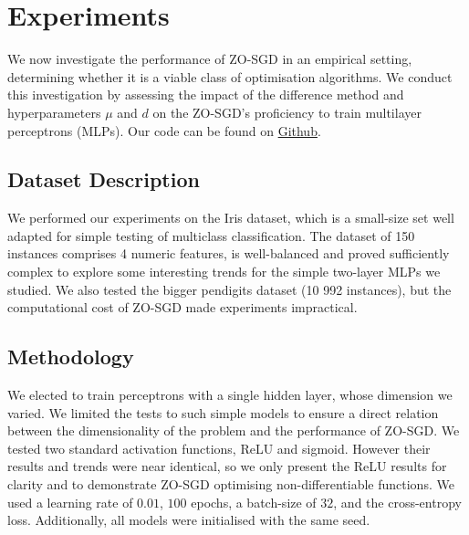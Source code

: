 \section{Experiments}\label{sec:exp}
We now investigate the performance of ZO-SGD in an empirical setting, determining whether it is a viable class of optimisation algorithms. We conduct this investigation by assessing the impact of the difference method and hyperparameters $\mu$ and $d$ on the ZO-SGD's proficiency to train multilayer perceptrons (MLPs). Our code can be found on \href{https://github.com/EdmundHofflin/Optimisation_ML_Project}{Github}.

\subsection{Dataset Description}

We performed our experiments on the Iris dataset, which is a small-size set well adapted for simple testing of multiclass classification. The dataset of 150 instances comprises 4 numeric features, is well-balanced and proved sufficiently complex to explore some interesting trends for the simple two-layer MLPs we studied. We also tested the bigger pendigits dataset (10 992 instances), but the computational cost of ZO-SGD made experiments impractical.

\subsection{Methodology}
We elected to train perceptrons with a single hidden layer, whose dimension we varied. We limited the tests to such simple models to ensure a direct relation between the dimensionality of the problem and the performance of ZO-SGD. We tested two standard activation functions, ReLU and sigmoid. However their results and trends were near identical, so we only present the ReLU results for clarity and to demonstrate ZO-SGD optimising non-differentiable functions. We used a learning rate of $0.01$, $100$ epochs, a batch-size of $32$, and the cross-entropy loss. Additionally, all models were initialised with the same seed.

